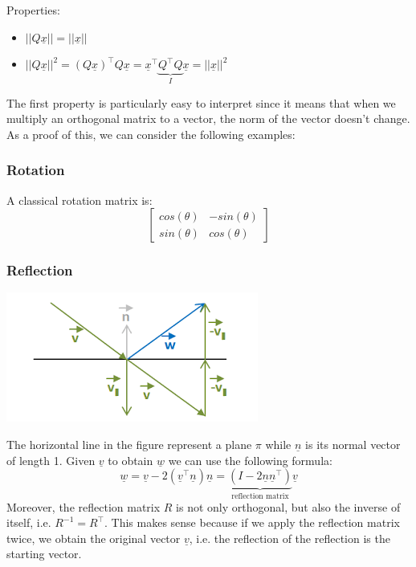 Properties:
\begin{itemize}
    \item $||Q\underline{x}|| = ||\underline{x}||$
    \item $||Q\underline{x}||^2 = (Q\underline{x})^\intercal Q\underline{x} = \underline{x}^\intercal \underbrace{Q^\intercal Q}_{I} \underline{x} = ||\underline{x}||^2$
\end{itemize}
The first property is particularly easy to interpret since it means that when we multiply an orthogonal matrix to a vector, the norm of the vector doesn't change. As a proof of this, we can consider the following examples:

\subsubsection{Rotation}
A classical rotation matrix is:
\[
\begin{bmatrix}
    cos(\theta) & -sin(\theta)\\
    sin(\theta) & cos(\theta)
\end{bmatrix}    
\]
\subsubsection{Reflection}
\begin{center}
    \includegraphics[scale=0.5]{../images/Reflection.png}
\end{center}
The horizontal line in the figure represent a plane $\pi$ while $\underline{n}$ is its normal vector of length 1. 
Given $\underline{v}$ to obtain $\underline{w}$ we can use the following formula:
\[
\underline{w} = \underline{v} - 2(\underline{v}^\intercal \underline{n})\underline{n} = \underbrace{(I - 2\underline{n}\underline{n}^\intercal)}_{\text{reflection matrix}}\underline{v}
\]
Moreover, the reflection matrix $R$ is not only orthogonal, but also the inverse of itself, i.e. $R^{-1} = R^\intercal$. This makes sense because if we apply the reflection matrix twice, we obtain the original vector $\underline{v}$, i.e. the reflection of the reflection is the starting vector.

